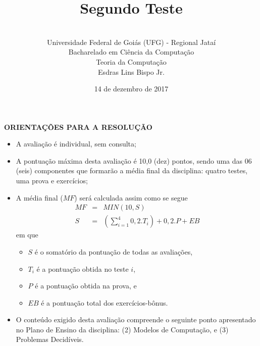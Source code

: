 \documentclass[12pt,a4paper,oneside]{article}
\author{\\Universidade Federal de Goiás (UFG) - Regional  Jataí\\Bacharelado em Ciência da Computação \\Teoria da Computação \\Esdras Lins Bispo Jr.}
\date{14 de dezembro de 2017}
\title{\sc \huge Segundo Teste}
\begin{document}
\maketitle

{\bf ORIENTAÇÕES PARA A RESOLUÇÃO}

\small
 
\begin{itemize}
	\item A avaliação é individual, sem consulta;
	\item A pontuação máxima desta avaliação é 10,0 (dez) pontos, sendo uma das 06 (seis) componentes que formarão a média final da disciplina: quatro testes, uma prova e exercícios;
	\item A média final ($MF$) será calculada assim como se segue
	\begin{eqnarray}
		MF & = & MIN(10, S) \nonumber \\
		S & = & (\sum_{i=1}^{4} 0,2.T_i ) + 0,2.P  + EB\nonumber
	\end{eqnarray}
	em que 
	\begin{itemize}
		\item $S$ é o somatório da pontuação de todas as avaliações,
		\item $T_i$ é a pontuação obtida no teste $i$,
		\item $P$ é a pontuação obtida na prova, e
		\item $EB$ é a pontuação total dos exercícios-bônus.
	\end{itemize}
	\item O conteúdo exigido desta avaliação compreende o seguinte ponto apresentado no Plano de Ensino da disciplina: (2) Modelos de Computação, e (3) Problemas Decidíveis.
\end{itemize}

\begin{center}
\end{center}

\newpage
\end{document}
